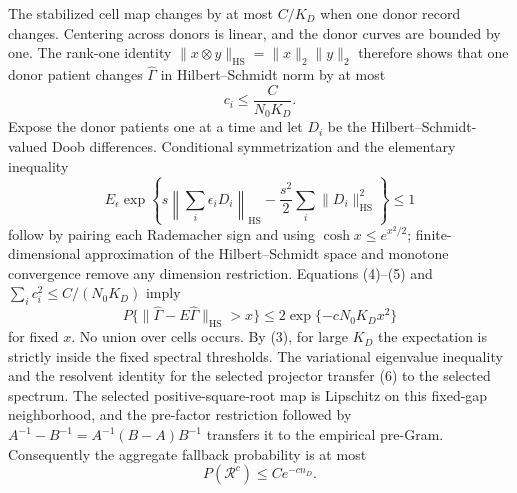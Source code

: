 The stabilized cell map changes by at most \(C/K_D\) when one donor
record changes.  Centering across donors is linear, and the donor curves
are bounded by one.  The rank-one identity
\(\|x\otimes y\|_{\mathrm{HS}}=\|x\|_2\|y\|_2\) therefore shows that one
donor patient changes \(\widehat\Gamma\) in Hilbert--Schmidt norm by at
most
\[
 c_i\le \frac{C}{N_0K_D}.                                  \tag{4}
\]
Expose the donor patients one at a time and let \(D_i\) be the
Hilbert--Schmidt-valued Doob differences.  Conditional symmetrization and
the elementary inequality
\[
 E_\epsilon\exp\left\{s\left\|\sum_i\epsilon_iD_i\right\|_{\mathrm{HS}}
 -\frac{s^2}{2}\sum_i\|D_i\|_{\mathrm{HS}}^2\right\}\le1 \tag{5}
\]
follow by pairing each Rademacher sign and using
\(\cosh x\le e^{x^2/2}\); finite-dimensional approximation of the
Hilbert--Schmidt space and monotone convergence remove any dimension
restriction.  Equations (4)--(5) and
\(\sum_i c_i^2\le C/(N_0K_D)\) imply
\[
 P\{\|\widehat\Gamma-E\widehat\Gamma\|_{\mathrm{HS}}>x\}
 \le2\exp\{-cN_0K_Dx^2\}                                  \tag{6}
\]
for fixed \(x\).  No union over cells occurs.  By (3), for large \(K_D\)
the expectation is strictly inside the fixed spectral thresholds.  The
variational eigenvalue inequality and the resolvent identity for the
selected projector transfer (6) to the selected spectrum.  The selected
positive-square-root map is Lipschitz on this fixed-gap neighborhood, and
the pre-factor restriction followed by
\(A^{-1}-B^{-1}=A^{-1}(B-A)B^{-1}\) transfers it to the empirical pre-Gram.
Consequently the aggregate fallback probability is at most
\[
 P(\mathcal R^c)\le Ce^{-cn_D}.                            \tag{7}
\]

